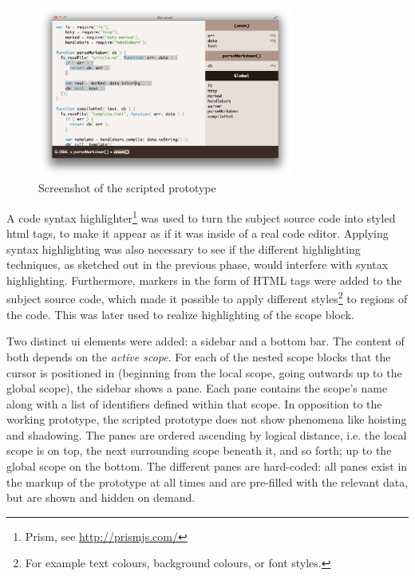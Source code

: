 \begin{figure}[htbp]
\centering
\includegraphics[keepaspectratio,width=0.75\textwidth,height=0.75\textheight]{img/prototype-1.png}
\caption{Screenshot of the scripted prototype}
\label{fig:scriptedprototype}
\end{figure}

A code syntax highlighter\footnote{Prism, see \url{http://prismjs.com/}}
was used to turn the subject source code into styled \ac{html} tags, to
make it appear as if it was inside of a real code editor. Applying
syntax highlighting was also necessary to see if the different
highlighting techniques, as sketched out in the previous phase, would
interfere with syntax highlighting. Furthermore, markers in the form of
HTML tags were added to the subject source code, which made it possible
to apply different
styles\footnote{For example text colours, background colours, or font styles.}
to regions of the code. This was later used to realize highlighting of
the scope block.

Two distinct \ac{ui} elements were added: a sidebar and a bottom bar.
The content of both depends on the \emph{active scope}. For each of the
nested scope blocks that the cursor is positioned in (beginning from the
local scope, going outwards up to the global scope), the sidebar shows a
pane. Each pane contains the scope’s name along with a list of
identifiers defined within that scope. In opposition to the working
prototype, the scripted prototype does not show phenomena like hoisting
and shadowing. The panes are ordered ascending by logical distance, i.e.
the local scope is on top, the next surrounding scope beneath it, and so
forth; up to the global scope on the bottom. The different panes are
hard-coded: all panes exist in the markup of the prototype at all times
and are pre-filled with the relevant data, but are shown and hidden on
demand.

